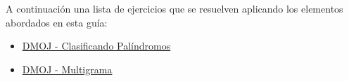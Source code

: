 A continuación una lista de ejercicios que se resuelven aplicando los elementos abordados en esta guía:

\begin{itemize}
	\item \href{https://dmoj.uclv.edu.cu/problem/clasipal}{DMOJ - Clasificando Palíndromos}
	\item \href{https://dmoj.uclv.edu.cu/problem/oci19day1c}{DMOJ - Multigrama}
\end{itemize}